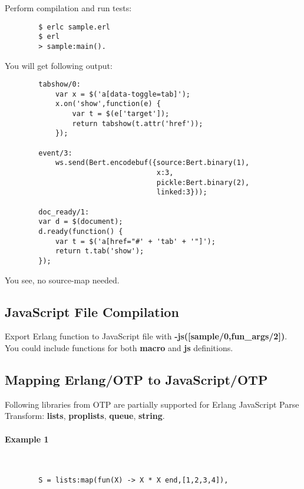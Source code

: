 \newpage
Perform compilation and run tests:

\vspace{1\baselineskip}
\begin{lstlisting}
        $ erlc sample.erl
        $ erl
        > sample:main().
\end{lstlisting}
\vspace{1\baselineskip}

You will get following output:

\vspace{1\baselineskip}
\begin{lstlisting}
        tabshow/0:
            var x = $('a[data-toggle=tab]');
            x.on('show',function(e) {
                var t = $(e['target']);
                return tabshow(t.attr('href'));
            });

        event/3:
            ws.send(Bert.encodebuf({source:Bert.binary(1),
                                    x:3,
                                    pickle:Bert.binary(2),
                                    linked:3}));

        doc_ready/1:
        var d = $(document);
        d.ready(function() {
            var t = $('a[href="#' + 'tab' + '"]');
            return t.tab('show');
        });
\end{lstlisting}
\vspace{1\baselineskip}

You see, no source-map needed.

\subsection{JavaScript File Compilation}
Export Erlang function to JavaScript file with {\bf -js([sample/0,fun\_{args}/2])}.
You could include functions for both {\bf macro} and {\bf js} definitions.

\newpage
\subsection{Mapping Erlang/OTP to JavaScript/OTP}
Following libraries from OTP are partially supported for Erlang JavaScript Parse Transform: 
{\bf lists}, {\bf proplists}, {\bf queue}, {\bf string}.

\paragraph{\bf Example 1}\ 
\vspace{1\baselineskip}
\begin{lstlisting}
        S = lists:map(fun(X) -> X * X end,[1,2,3,4]),
\end{lstlisting}

